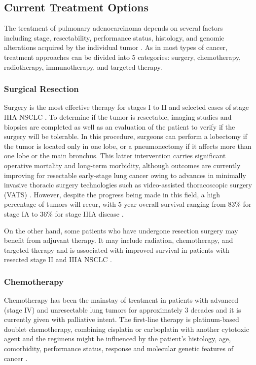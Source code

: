 \subsection{Current Treatment Options}

The treatment of pulmonary adenocarcinoma depends on several factors including stage, resectability, performance status, histology, and genomic alterations acquired by the individual tumor \cite{NSCLC}. As in most types of cancer, treatment approaches can be divided into 5 categories: surgery, chemotherapy, radiotherapy, immunotherapy, and targeted therapy.

\subsubsection{Surgical Resection}

Surgery is the most effective therapy for stages I to II and selected cases of stage IIIA NSCLC \cite{NSCLC_therapies}. To determine if the tumor is resectable, imaging studies and biopsies are completed as well as an evaluation of the patient to verify if the surgery will be tolerable. In this procedure, surgeons can perform a lobectomy if the tumor is located only in one lobe, or a pneumonectomy if it affects more than one lobe or the main bronchus. This latter intervention carries significant operative mortality and long-term morbidity, although outcomes are currently improving for resectable early-stage lung cancer owing to advances in minimally invasive thoracic surgery technologies such as video-assisted thoracoscopic surgery (VATS) \cite{VATS}. However, despite the progress being made in this field, a high percentage of tumors will recur, with 5-year overall survival ranging from 83\% for stage IA to 36\% for stage IIIA disease \cite{TNM_proposal}.

On the other hand, some patients who have undergone resection surgery may benefit from adjuvant therapy. It may include radiation, chemotherapy, and targeted therapy and is associated with improved survival in patients with resected stage II and IIIA NSCLC \cite{Adjuvant}.

\subsubsection{Chemotherapy}

Chemotherapy has been the mainstay of treatment in patients with advanced (stage IV) and unresectable lung tumors for approximately 3 decades and it is currently given with palliative intent. The first-line therapy is platinum-based doublet chemotherapy, combining cisplatin or carboplatin with another cytotoxic agent and the regimens might be influenced by the patient's histology, age, comorbidity, performance status,  response and molecular genetic features of cancer \cite{NSCLC_therapies}.

